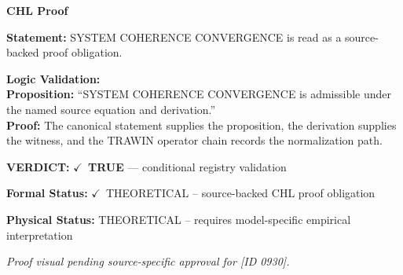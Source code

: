 \vspace{0.45em}
\noindent\textbf{CHL Proof}\par
\textbf{Statement:} SYSTEM COHERENCE CONVERGENCE is read as a source-backed proof obligation.

\textbf{Logic Validation:}\\
\textbf{Proposition:} ``SYSTEM COHERENCE CONVERGENCE is admissible under the named source equation and derivation.''\\
\textbf{Proof:} The canonical statement supplies the proposition, the derivation supplies the witness, and the TRAWIN operator chain records the normalization path.

\textbf{VERDICT:} \ensuremath{\checkmark}\ \textbf{TRUE} --- conditional registry validation

\textbf{Formal Status:} \ensuremath{\checkmark}\ THEORETICAL -- source-backed CHL proof obligation

\textbf{Physical Status:} THEORETICAL -- requires model-specific empirical interpretation
\par\vspace{0.45em}
\par
\vfill
\begingroup\footnotesize\itshape
Proof visual pending source-specific approval for [ID 0930].
\par\endgroup
\vfill
\endgroup
\endgroup
